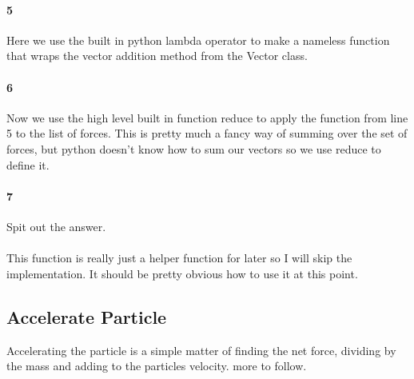 \documentclass[15pt]{report}
\begin{document}
\paragraph{5} Here we use the built in python lambda operator to make a nameless function that wraps the vector addition method from the Vector class.
\paragraph{6} Now we use the high level built in function reduce to apply the function from line 5 to the list of forces. This is pretty much a fancy way of summing over the set of forces, but python doesn't know how to sum our vectors so we use reduce to define it.
\paragraph{7} Spit out the answer.
\paragraph{} This function is really just a helper function for later so I will skip the implementation. It should be pretty obvious how to use it at this point.
\subsection{Accelerate Particle}
Accelerating the particle is a simple matter of finding the net force, dividing by the mass and adding to the particles velocity. more to follow. 
\printbibliography
\end{document}
